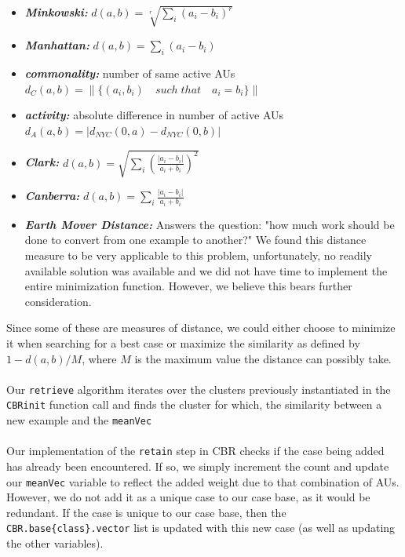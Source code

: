 \documentclass[a4paper,12pt,oneside,final]{report}
\begin{document}
\begin{itemize}
\item {\bf\textit{Minkowski:}} $d(a,b) = \sqrt[r]{\sum_i (a_i - b_i)^r}$
\item {\bf\textit{Manhattan:}} $d(a,b) = \sum_i (a_i - b_i)$
\item {\bf\textit{commonality:}} number of same active AUs $d_C(a, b) = \|\{(a_i, b_i) \quad such\; that \quad a_i = b_i\}\|$
\item {\bf\textit{activity:}} absolute difference in number of active AUs $d_A(a,b) = |d_{NYC}(0, a) - d_{NYC}(0, b)|$
\item {\bf\textit{Clark:}} $d(a, b) = \sqrt{\sum_i \left( \frac{|a_i - b_i|}{a_i + b_i} \right)^2}$
\item {\bf\textit{Canberra:}} $d(a, b) = \sum_i \frac{|a_i - b_i|}{a_i + b_i}$
\item {\bf\textit{Earth Mover Distance:}} Answers the question: "how much work should be done to convert from one example to another?"  We found this distance measure to be very applicable to this problem, unfortunately, no readily available solution was available and we did not have time to implement the entire minimization function.  However, we believe this bears further consideration.
\end{itemize}
Since some of these are measures of distance, we could either choose to minimize it when searching for a best case or maximize the similarity as defined by $1 - {d(a,b)}/M$, where $M$ is the maximum value the distance can possibly take.

\paragraph{}
Our \verb+retrieve+ algorithm iterates over the clusters previously instantiated in the \verb+CBRinit+ function call and finds the cluster for which, the similarity between a new example and the \verb+meanVec+  
\paragraph{}
Our implementation of the \verb+retain+ step in CBR checks if the case being added has already been encountered.  If so, we simply increment the count and update our \verb+meanVec+ variable to reflect the added weight due to that combination of AUs.  However, we do not add it as a unique case to our case base, as it would be redundant.  If the case is unique to our case base, then the \verb+CBR.base{class}.vector+ list is updated with this new case (as well as updating the other variables).
\end{document}
